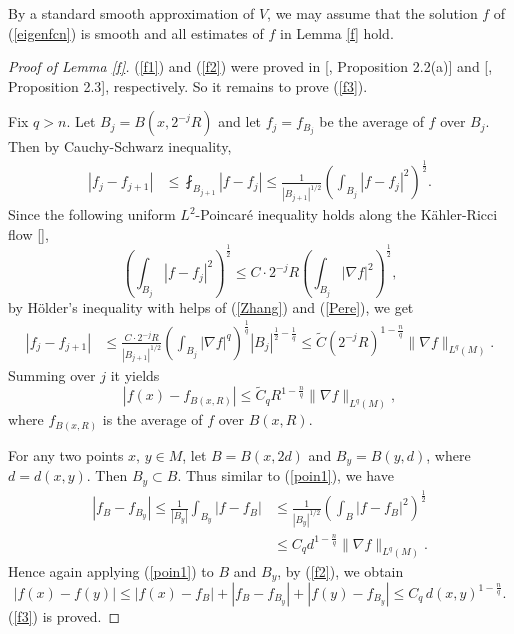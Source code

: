 \documentclass[11pt]{amsart}
\numberwithin{equation}{section}
\begin{document}
By a standard smooth approximation of $V$, we may assume that the solution  $f$ of (\ref{eigenfcn}) is smooth and all estimates  of $f$ in Lemma \ref {f} hold.



\begin{proof}[Proof of Lemma \ref{f}] (\ref{f1}) and (\ref{f2}) were proved in  [\cite{TZZZZ}, Proposition 2.2(a)] and [\cite{TZZZZ}, Proposition 2.3], respectively. So it remains to prove (\ref{f3}). 
	
	 Fix $q>n$. Let $B_j=B(x,2^{-j}R)$ and let $f_j=f_{B_j}$ be the average of $f$ over $B_j$. Then by Cauchy-Schwarz inequality,
	\begin{align*}
		|f_j-f_{j+1}|&\leq \fint_{B_{j+1}}|f-f_j|\leq \frac{1}{|B_{j+1}|^{1/2}}\left(\int_{B_{j}}|f-f_j|^2\right)^{\frac{1}{2}}.
	\end{align*}
	Since the following  uniform $L^2$-Poincar\'{e} inequality  holds along the K\"{a}hler-Ricci flow [\cite{TZq}],
	\[
	\left(\int_{B_{j}}|f-f_j|^2\right)^{\frac{1}{2}}\leq C\cdot 2^{-j}R\left(\int_{B_{j}}|\nabla f|^2\right)^{\frac{1}{2}},
	\]
by  H\"{o}lder's inequality with helps of  (\ref{Zhang}) and (\ref{Pere}),  we get
	\begin{align*}
		|f_j-f_{j+1}|&\leq \frac{C\cdot2^{-j}R}{|B_{j+1}|^{1/2}}\left(\int_{B_{j}}|\nabla f|^q\right)^{\frac{1}{q}}|B_j|^{\frac{1}{2}-\frac{1}{q}}\leq \tilde{C}(2^{-j}R)^{1-\frac{n}{q}}\|\nabla f\|_{L^q(M)}.
	\end{align*}
	Summing over $j$  it yields
	\begin{equation}\label{poin1}
	|f(x)-f_{B(x,R)}|\leq \tilde{C}_qR^{1-\frac{n}{q}}\|\nabla f\|_{L^q(M)},
	\end{equation}
	where $f_{B(x,R)}$ is the average of $f$ over $B(x,R)$.
	
	For any two points  $x,\,y\in M$,   let $B=B(x,2d)$ and $B_y=B(y,d)$, where $d=d(x,y)$. Then $B_y\subset B$.  Thus similar to (\ref{poin1}), we have
	\begin{align*}
		|f_B-f_{B_y}|\leq\frac{1}{|B_y|}\int_{B_y}|f-f_B| &\leq \frac{1}{|B_y|^{1/2}}\left(\int_{B}|f-f_B|^2\right)^{\frac{1}{2}}\\
		&\leq C_qd^{1-\frac{n}{q}}\|\nabla f\|_{L^q(M)}.
	\end{align*}
	Hence again  applying (\ref{poin1}) to $B$ and $B_y$, by  (\ref{f2}), we obtain 
	\[
	|f(x)-f(y)|\leq |f(x)-f_B|+|f_B-f_{B_y}|+|f(y)-f_{B_y}|\leq C_q\,d(x,y)^{1-\frac{n}{q}}.
	\]
 (\ref{f3}) is proved.
\end{proof}
\end{document}
